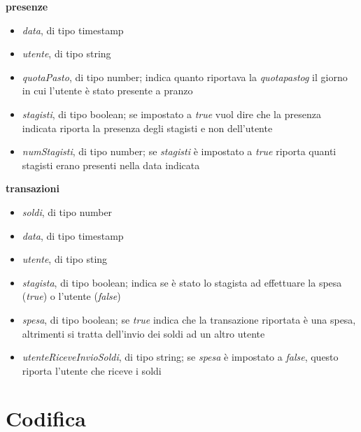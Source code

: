 \textbf{presenze}
\begin{itemize}
    \item \emph{data}, di tipo timestamp
    \item \emph{utente}, di tipo string
    \item \emph{quotaPasto}, di tipo number; indica quanto riportava la \emph{\gls{quotapastog}} il giorno in cui l'utente è stato presente a pranzo
    \item \emph{stagisti}, di tipo boolean; se impostato a \emph{true} vuol dire che la presenza indicata riporta la presenza degli stagisti e non dell'utente
    \item \emph{numStagisti}, di tipo number; se \emph{stagisti} è impostato a \emph{true} riporta quanti stagisti erano presenti nella data indicata
\end{itemize}
\newpage
\textbf{transazioni}
\begin{itemize}
    \item \emph{soldi}, di tipo number
    \item \emph{data}, di tipo timestamp
    \item \emph{utente}, di tipo sting
    \item \emph{stagista}, di tipo boolean; indica se è stato lo stagista ad effettuare la spesa (\emph{true}) o l'utente (\emph{false})
    \item \emph{spesa}, di tipo boolean; se \emph{true} indica che la transazione riportata è una spesa, altrimenti si tratta dell'invio dei soldi ad un altro utente
    \item \emph{utenteRiceveInvioSoldi}, di tipo string; se \emph{spesa} è impostato a \emph{false}, questo riporta l'utente che riceve i soldi
\end{itemize}



\section{Codifica} %


